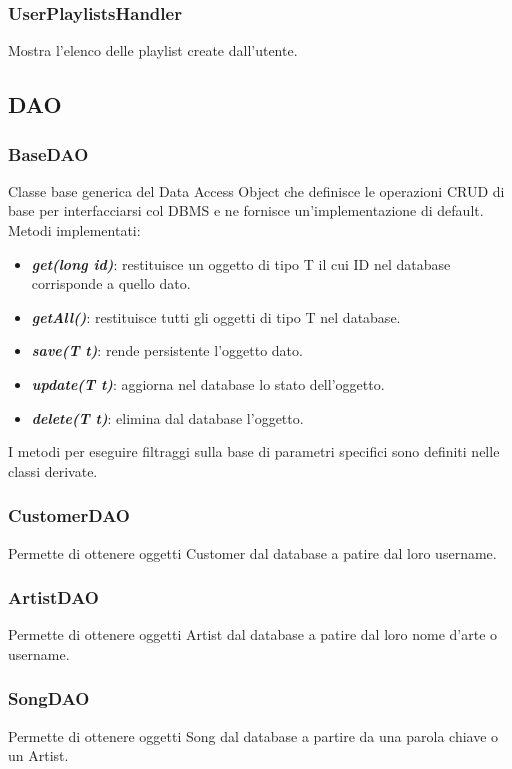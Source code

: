 \documentclass{article}
\begin{document}
  \subsubsection{UserPlaylistsHandler}
  Mostra l'elenco delle playlist create dall'utente.

  \subsection{DAO}

  \subsubsection{BaseDAO}
  Classe base generica del Data Access Object che definisce le operazioni CRUD di base per interfacciarsi col DBMS e ne fornisce un'implementazione di default.
  Metodi implementati:
  \begin{itemize}
      \item \textbf{\textit{get(long id)}}: restituisce un oggetto di tipo T il cui ID nel database corrisponde a quello dato.
      \item \textbf{\textit{getAll()}}: restituisce tutti gli oggetti di tipo T nel database.
      \item \textbf{\textit{save(T t)}}: rende persistente l'oggetto dato.
      \item \textbf{\textit{update(T t)}}: aggiorna nel database lo stato dell'oggetto.
      \item \textbf{\textit{delete(T t)}}: elimina dal database l'oggetto.
  \end{itemize}
   I metodi per eseguire filtraggi sulla base di parametri specifici sono definiti nelle classi derivate.

  \subsubsection{CustomerDAO}
  Permette di ottenere oggetti Customer dal database a patire dal loro username.

  \subsubsection{ArtistDAO}
  Permette di ottenere oggetti Artist dal database a patire dal loro nome d'arte o username.

  \subsubsection{SongDAO}
  Permette di ottenere oggetti Song dal database a partire da una parola chiave o un Artist.
\end{document}
